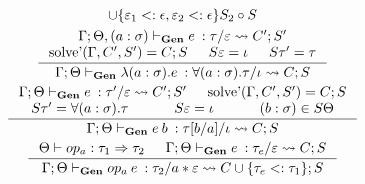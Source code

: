 \documentclass[declaration,shortabstract]{iithesis}
\theoremstyle{definition} \newtheorem{definition}{Definition}[section]
\newcommand{\gens}[6][\Gamma;\Theta]{\ensuremath{{{#1} \vdash_\textbf{Gen} {#2} \: : {#3}/{#4}} \rightsquigarrow {#5};{#6}}}
\begin{document}
\begin{gather*}
\begin{gathered}
{{    \cup \{ \varepsilon_1 <: \epsilon, \varepsilon_2 <: \epsilon\}}{S_2 \circ S}
}
\\
\inference{
    \gens[\Gamma; \Theta, (a : \sigma)]{e}{\tau}{\varepsilon}{C'}{S'} \\
    \operatorname{solve'}(\Gamma, C', S') = C; S &
    S \varepsilon = \iota &
    S \tau' = \tau
}{
    \gens{\lambda (a : \sigma). e}{\forall (a : \sigma) . \tau}{\iota}{C}{S}
}
\\
\inference{
    \gens{e}{\tau'}{\varepsilon}{C'}{S'} &
    \operatorname{solve'}(\Gamma, C', S') = C; S  \\
    S \tau' = \forall (a : \sigma) . \tau &
    S \varepsilon = \iota &
    (b:\sigma) \in S\Theta
}{
    \gens{e\:b}{\tau[b/a]}{\iota}{C}{S}
}
\\
\inference{
    \Theta \vdash op_a : \tau_1 \Rightarrow \tau_2 &
    \gens{e}{\tau_e}{\varepsilon}{C}{S}
}{
    \gens{op_a \: e}{\tau_2}{a * \varepsilon}{C \cup \{\tau_e <: \tau_1 \}}{S}
}\end{gathered}
\end{gather*}
\end{document}
